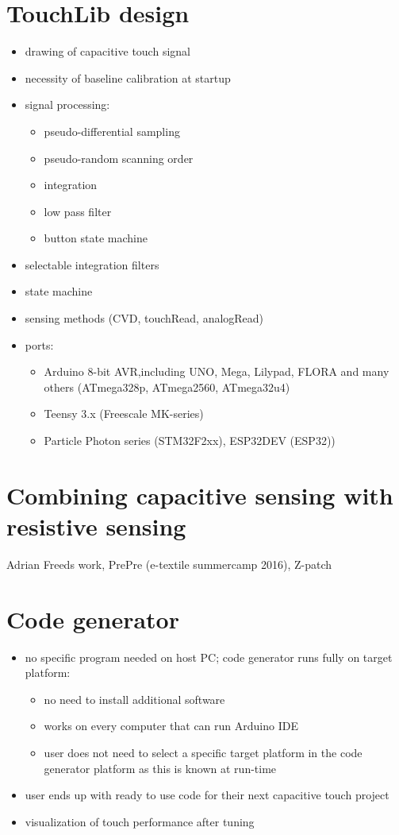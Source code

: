 \documentclass[format=sigchi, screen=true, review=true]{acmart}
\begin{document}
\section{TouchLib design}
\begin{itemize}
\item drawing of capacitive touch signal
\item necessity of baseline calibration at startup
\item signal processing:
	\begin{itemize}
	\item pseudo-differential sampling
	\item pseudo-random scanning order
	\item integration
	\item low pass filter
	\item button state machine
	\end{itemize}
\item selectable integration filters
\item state machine
\item sensing methods (CVD, touchRead, analogRead)
\item ports:
	\begin{itemize}
	\item Arduino 8-bit AVR,including UNO, Mega, Lilypad, FLORA and many others (ATmega328p, ATmega2560, ATmega32u4)
	\item Teensy 3.x (Freescale MK-series)
	\item Particle Photon series (STM32F2xx), ESP32DEV (ESP32))
	\end{itemize}
\end{itemize}

\section{Combining capacitive sensing with resistive sensing}
Adrian Freeds work, PrePre (e-textile summercamp 2016), Z-patch

\section{Code generator}
\begin{itemize}
\item no specific program needed on host PC; code generator runs fully on target platform:
	\begin{itemize}
	\item no need to install additional software
	\item works on every computer that can run Arduino IDE
	\item user does not need to select a specific target platform in the code generator platform as this is known at run-time
	\end{itemize}
\item user ends up with ready to use code for their next capacitive touch project
\item visualization of touch performance after tuning
\end{itemize}
\end{document}
